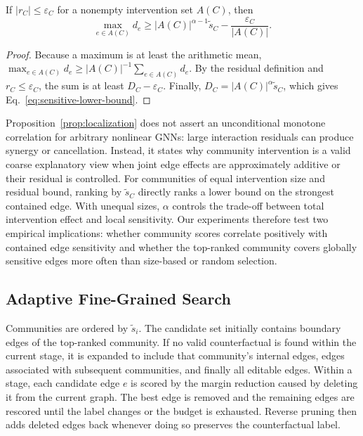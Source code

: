 \documentclass[runningheads]{llncs}
\begin{document}
\begin{proposition}
\label{prop:localization}
If $|r_C|\leq\varepsilon_C$ for a nonempty intervention set $A(C)$, then
\begin{equation}
  \max_{e\in A(C)} d_e
  \geq |A(C)|^{\alpha-1}\widetilde{s}_C
  -\frac{\varepsilon_C}{|A(C)|}.
  \label{eq:sensitive-lower-bound}
\end{equation}
\end{proposition}

\begin{proof}
Because a maximum is at least the arithmetic mean,
$\max_{e\in A(C)}d_e\geq |A(C)|^{-1}\sum_{e\in A(C)}d_e$. By the residual
definition and $r_C\leq\varepsilon_C$, the sum is at least
$D_C-\varepsilon_C$. Finally,
$D_C=|A(C)|^\alpha\widetilde{s}_C$, which gives
Eq.~\eqref{eq:sensitive-lower-bound}.
\end{proof}

Proposition~\ref{prop:localization} does not assert an unconditional monotone
correlation for arbitrary nonlinear GNNs: large interaction residuals can
produce synergy or cancellation. Instead, it states why community
intervention is a valid coarse explanatory view when joint edge effects are
approximately additive or their residual is controlled. For communities of
equal intervention size and residual bound, ranking by $\widetilde{s}_C$
directly ranks a lower bound on the strongest contained edge. With unequal
sizes, $\alpha$ controls the trade-off between total intervention effect and
local sensitivity. Our experiments therefore test two empirical implications:
whether community scores correlate positively with contained edge sensitivity
and whether the top-ranked community covers globally sensitive edges more
often than size-based or random selection.

\subsection{Adaptive Fine-Grained Search}
Communities are ordered by $\widetilde{s}_i$. The candidate set initially
contains boundary edges of the top-ranked community. If no valid
counterfactual is found within the current stage, it is expanded to include
that community's internal edges, edges associated with subsequent communities,
and finally all editable edges. Within a stage, each candidate edge $e$ is
scored by the margin reduction caused by deleting it from the current graph.
The best edge is removed and the remaining edges are rescored until the label
changes or the budget is exhausted. Reverse pruning then adds deleted edges
back whenever doing so preserves the counterfactual label.
\end{document}
